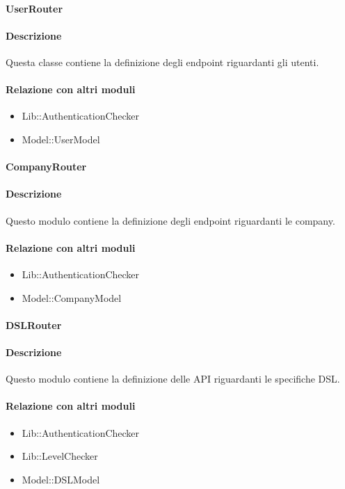 \paragraph{UserRouter}
\paragraph*{Descrizione}
Questa classe contiene la definizione degli endpoint riguardanti gli utenti. 

\paragraph*{Relazione con altri moduli}
\begin{itemize}
\item Lib::AuthenticationChecker
\item Model::UserModel
\end{itemize}

\paragraph{CompanyRouter}
\paragraph*{Descrizione}
Questo modulo contiene la definizione degli endpoint riguardanti le company.

\paragraph*{Relazione con altri moduli}
\begin{itemize}
\item Lib::AuthenticationChecker
\item Model::CompanyModel
\end{itemize}

\paragraph{DSLRouter}
\paragraph*{Descrizione}
Questo modulo contiene la definizione delle API riguardanti le specifiche DSL.

\paragraph*{Relazione con altri moduli}
\begin{itemize}
\item Lib::AuthenticationChecker
\item Lib::LevelChecker
\item Model::DSLModel
\end{itemize}

